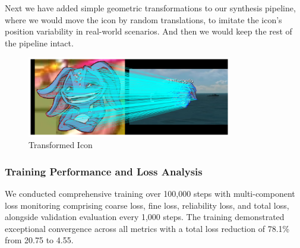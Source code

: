 Next we have added simple geometric transformations to our synthesis pipeline, where we would move the icon by random translations, to imitate the icon's position variability in real-world scenarios. And then we would keep the rest of the pipeline intact.
\begin{figure}[H]
    \centering
    \includegraphics[width=0.8\textwidth]{ressources/image_3.png}
    \caption{Transformed Icon}
    \label{fig:transformed_icon}
\end{figure}
\subsubsection{Training Performance and Loss Analysis}

We conducted comprehensive training over 100,000 steps with multi-component
loss monitoring comprising coarse loss, fine loss, reliability loss, and total
loss, alongside validation evaluation every 1,000 steps. The training
demonstrated exceptional convergence across all metrics with a total loss
reduction of 78.1\% from 20.75 to 4.55.

